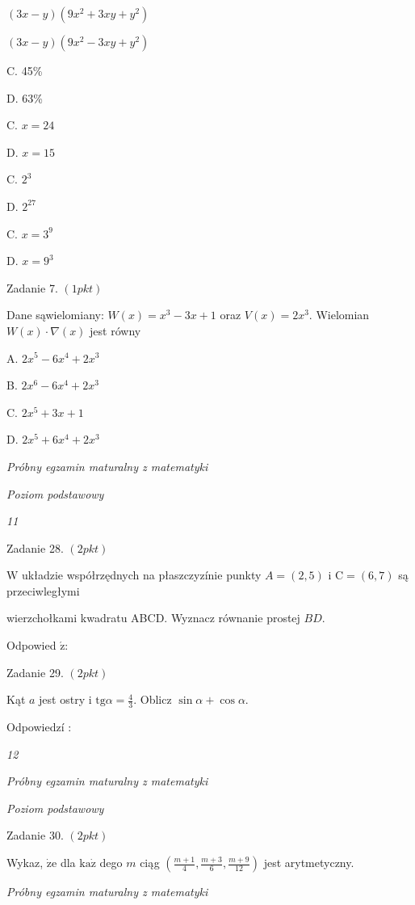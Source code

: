 \documentclass[a4paper,12pt]{article}
\begin{document}
$(3x-y)(9x^{2}+3xy+y^{2})$

$(3x-y)(9x^{2}-3xy+y^{2})$

C. 45\%

D. 63\%

C. $x=24$

D. $x=15$

C. $2^{3}$

D. $2^{27}$

C. $x=3^{9}$

D. $x=9^{3}$

Zadanie 7. $(1pkt)$

Dane sąwielomiany: $W(x)=x^{3}-3x+1$ oraz $V(x)=2x^{3}$. Wielomian $W(x)\cdot\nabla(x)$ jest równy

A. $2x^{5}-6x^{4}+2x^{3}$

B. $2x^{6}-6x^{4}+2x^{3}$

C. $2x^{5}+3x+1$

D. $2x^{5}+6x^{4}+2x^{3}$





{\it Próbny egzamin maturalny z matematyki}

{\it Poziom podstawowy}

{\it 11}

Zadanie 28. $(2pkt)$

$\mathrm{W}$ układzie współrzędnych na płaszczyzínie punkty $A=(2,5)$ i $\mathrm{C}=(6,7)$ są przeciwległymi

wierzchołkami kwadratu ABCD. Wyznacz równanie prostej $BD.$

Odpowied $\acute{\mathrm{z}}$:

Zadanie 29. $(2pkt)$

Kąt $a$ jest ostry i $\displaystyle \mathrm{t}\mathrm{g}\alpha=\frac{4}{3}$. Oblicz $\sin\alpha+\cos\alpha.$

Odpowiedzí :





{\it 12}

{\it Próbny egzamin maturalny z matematyki}

{\it Poziom podstawowy}

Zadanie 30. $(2pkt)$

Wykaz, $\dot{\mathrm{z}}\mathrm{e}$ dla $\mathrm{k}\mathrm{a}\dot{\mathrm{z}}$ dego $m$ ciąg $(\displaystyle \frac{m+1}{4},\frac{m+3}{6},\frac{m+9}{12})$ jest arytmetyczny.





{\it Próbny egzamin maturalny z matematyki}
\end{document}
